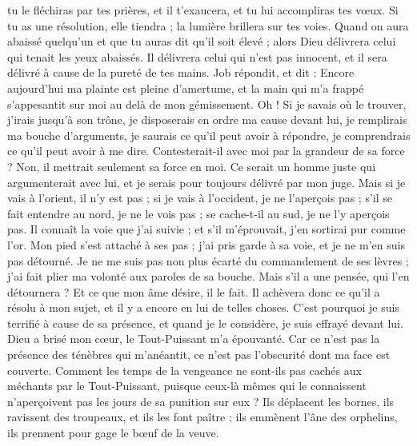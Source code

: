 \begin{multicols}{2}
tu le fléchiras par tes prières, et il t'exaucera, et tu lui accompliras tes vœux.
Si tu as une résolution, elle tiendra ; la lumière brillera sur tes voies.
Quand on aura abaissé quelqu'un et que tu auras dit qu'il soit élevé ; alors Dieu délivrera celui qui tenait les yeux abaissés.
Il délivrera celui qui n'est pas innocent, et il sera délivré à cause de la pureté de tes mains.
\VerseOne{}Job répondit, et dit :
Encore aujourd'hui ma plainte est pleine d'amertume, et la main qui m'a frappé s'appesantit sur moi au delà de mon gémissement.
Oh ! Si je savais où le trouver, j'irais jusqu'à son trône,
je disposerais en ordre ma cause devant lui, je remplirais ma bouche d'arguments,
je saurais ce qu'il peut avoir à répondre, je comprendrais ce qu'il peut avoir à me dire.
Contesterait-il avec moi par la grandeur de sa force ? Non, il mettrait seulement sa force en moi. 
Ce serait un homme juste qui argumenterait avec lui, et je serais pour toujours délivré par mon juge.
Mais si je vais à l'orient, il n'y est pas ; si je vais à l'occident, je ne l'aperçois pas ;
s'il se fait entendre au nord, je ne le vois pas ; se cache-t-il au sud, je ne l'y aperçois pas.
Il connaît la voie que j'ai suivie ; et s'il m'éprouvait, j'en sortirai pur comme l'or.
Mon pied s'est attaché à ses pas ; j'ai pris garde à sa voie, et je ne m'en suis pas détourné.
Je ne me suis pas non plus écarté du commandement de ses lèvres ; j'ai fait plier ma volonté aux paroles de sa bouche.
Mais s'il a une pensée, qui l'en détournera ? Et ce que mon âme désire, il le fait.
Il achèvera donc ce qu'il a résolu à mon sujet, et il y a encore en lui de telles choses.
C'est pourquoi je suis terrifié à cause de sa présence, et quand je le considère, je suis effrayé devant lui.
Dieu a brisé mon cœur, le Tout-Puissant m'a épouvanté.
Car ce n'est pas la présence des ténèbres qui m'anéantit, ce n'est pas l'obscurité dont ma face est couverte.
\VerseOne{}Comment les temps de la vengeance ne sont-ils pas cachés aux méchants par le Tout-Puissant, puisque ceux-là mêmes qui le connaissent n'aperçoivent pas les jours de sa punition sur eux ?
Ils déplacent les bornes, ils ravissent des troupeaux, et ils les font paître ;
ils emmènent l'âne des orphelins, ils prennent pour gage le bœuf de la veuve.

\end{multicols}
